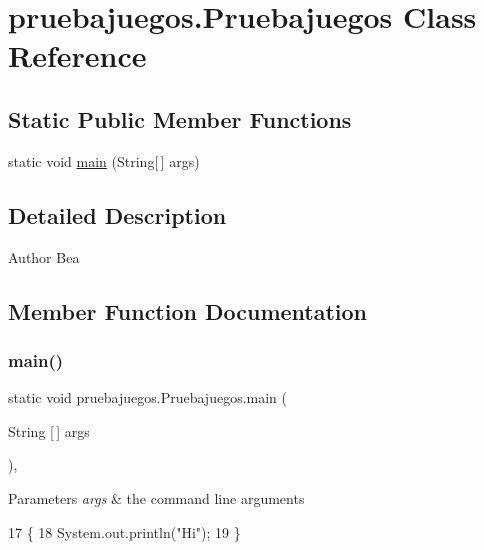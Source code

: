 \hypertarget{classpruebajuegos_1_1_pruebajuegos}{}\section{pruebajuegos.\+Pruebajuegos Class Reference}
\label{classpruebajuegos_1_1_pruebajuegos}
\subsection*{Static Public Member Functions}
\begin{DoxyCompactItemize}
\item 
static void \mbox{\hyperlink{classpruebajuegos_1_1_pruebajuegos_a1af490a49b337d808c661c530340bb94}{main}} (String\mbox{[}$\,$\mbox{]} args)
\end{DoxyCompactItemize}


\subsection{Detailed Description}
\begin{DoxyAuthor}{Author}
Bea 
\end{DoxyAuthor}


\subsection{Member Function Documentation}
\mbox{\label{classpruebajuegos_1_1_pruebajuegos_a1af490a49b337d808c661c530340bb94}} 
\subsubsection{\texorpdfstring{main()}{main()}}
{\footnotesize\ttfamily static void pruebajuegos.\+Pruebajuegos.\+main (\begin{DoxyParamCaption}\item[{String \mbox{[}$\,$\mbox{]}}]{args }\end{DoxyParamCaption})\hspace{0.3cm}{\ttfamily [inline]}, {\ttfamily [static]}}


\begin{DoxyParams}{Parameters}
{\em args} & the command line arguments \\
\hline
\end{DoxyParams}

\begin{DoxyCode}
17                                            \{
18         System.out.println(\textcolor{stringliteral}{"Hi"});
19     \}
\end{DoxyCode}
